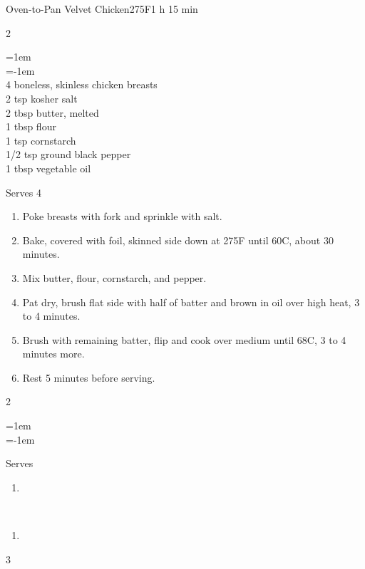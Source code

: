 \documentclass{article}
\makeatletter
\newcommand*{\whiten}[1]{\llap{\textcolor{white}{{\the\SOUL@token}}\hspace{#1pt}}}
\DeclareRobustCommand*\ful{%
    \def\SOUL@everyspace{\underline{\space}\kern\z@}%
    \def\SOUL@everytoken{%
     \setbox0=\hbox{\the\SOUL@token}%
     \ifdim\dp0>\z@
        \raisebox{\dp0}{\underline{\phantom{\the\SOUL@token}}}%
        \whiten{1}\whiten{0}%
        \whiten{-1}\whiten{-2}%
        \llap{\the\SOUL@token}%
     \else
        \underline{\the\SOUL@token}%
     \fi}%
\SOUL@}
\newenvironment{card}[3][]
    {\begin{cardbase}[#1]{#2}{#3}\\}
    {\end{cardbase}}
\newenvironment{densecard}[3][]
    {\small
    \begin{card}[#1]{#2}{#3}}
    {\end{card}}
\newenvironment{recipe}[3][]
    {\begin{cardbase}[#1]{#2}{#3}
    \columnratio{0.333}
    \begin{paracol}{2}}
    {\end{paracol}\end{cardbase}}
\newenvironment{denserecipe}[3][]
    {\small
    \begin{recipe}[#1]{#2}{#3}}
    {\end{recipe}}
\newcommand{\nextcolumn}{\switchcolumn}
\newenvironment{ingredients}
    {
    \begin{obeylines}
    \vspace{\parskip}
    \setlength{\parskip}{0.25em}
    \vspace{-0.25em}
    \leftskip=1em
    \parindent=-1em}
    {\end{obeylines}}
\newenvironment{steps}
    {\begin{enumerate}[leftmargin=*,topsep=0pt]}
    {\end{enumerate}}
\newcommand{\celsius}[1]{#1\textdegree{}C}
\newcommand{\fahrenheit}[1]{#1\textdegree{}F}
\newcommand{\tag}[1]{\hspace{1em}#1}
\newcommand{\symboltag}[2]{\tag{#1\hspace{0.4em}#2}}
\newcommand{\totaltime}[1]{\symboltag{\raisebox{-0.1em}{\small\StopWatchEnd}}{#1}}
\newcommand{\preheat}[1]{\symboltag{\Topbottomheat}{#1}}
\newcommand{\ihead}[1]{\ful{#1}}
\newcommand{\ijoin}{$\cdot{}$}
\makeatother
\begin{document}
\begin{denserecipe}{Oven-to-Pan Velvet Chicken}{\preheat{\fahrenheit{275}}\totaltime{1 h 15 min}}
\begin{ingredients}
4 boneless, skinless chicken breasts
2 tsp kosher salt
2 tbsp butter, melted
1 tbsp flour
1 tsp cornstarch
1/2 tsp ground black pepper
1 tbsp vegetable oil
\end{ingredients}
\nextcolumn
Serves 4
\begin{steps}
    \item Poke breasts with fork and sprinkle with salt.
    \item Bake, covered with foil, skinned side down at \fahrenheit{275} until \celsius{60}, about 30 minutes.
    \item Mix butter, flour, cornstarch, and pepper.
    \item Pat dry, brush flat side with half of batter and brown in oil over high heat, 3 to 4 minutes.
    \item Brush with remaining batter, flip and cook over medium until \celsius{68}, 3 to 4 minutes more.
    \item Rest 5 minutes before serving.
\end{steps}
\end{denserecipe}

\iffalse

\begin{recipe}{}{\tag{}\preheat{}\totaltime{}}
\begin{ingredients}
\end{ingredients}
\nextcolumn
Serves
\begin{steps}
    \item
\end{steps}
\end{recipe}

\begin{densecard}{}{\tag{}\preheat{}\totaltime{}}
\begin{steps}
    \item
\end{steps}
\begin{paracol}{3}
\end{paracol}
\end{densecard}

\end{document}
